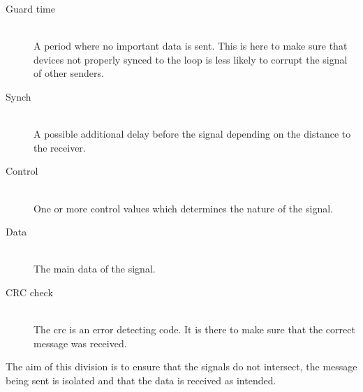 \begin{description}
\item[Guard time] \hfill \\ 
A period where no important data is sent.
This is here to make sure that devices not properly synced to the loop is less likely to corrupt the signal of other senders.

\item[Synch] \hfill \\ 
A possible additional delay before the signal depending on the distance to the receiver.

\item[Control] \hfill \\
One or more control values which determines the nature of the signal.

\item[Data] \hfill \\
The main data of the signal.

\item[CRC check] \hfill \\
The \gls{crc} is an error detecting code. It is there to make sure that the correct message was received. 
\end{description}
\bigskip
\noindent

The aim of this division is to ensure that the signals do not intersect, the message being sent is isolated and that the data is received as intended.